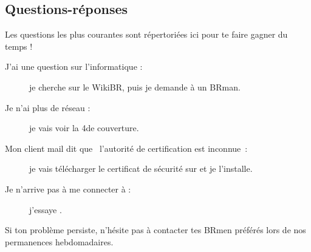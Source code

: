 \subsection{Questions-réponses}

Les questions les plus courantes sont répertoriées ici pour te faire gagner du temps !

\begin{description}

\item[J'ai une question sur l'informatique : ] je cherche sur le WikiBR, puis je demande à un BRman.

\item[Je n'ai plus de réseau : ] je vais voir la 4\ieme de couverture.

\item[Mon client mail dit que \guillemotleft~l'autorité de certification est inconnue~\guillemotright : ] je vais télécharger le certificat de sécurité
sur  et je l'installe.


\item[Je n'arrive pas à me connecter à  : ] j'essaye .




\end{description}

Si ton problème persiste, n'hésite pas à contacter tes BRmen préférés lors de nos permanences hebdomadaires.